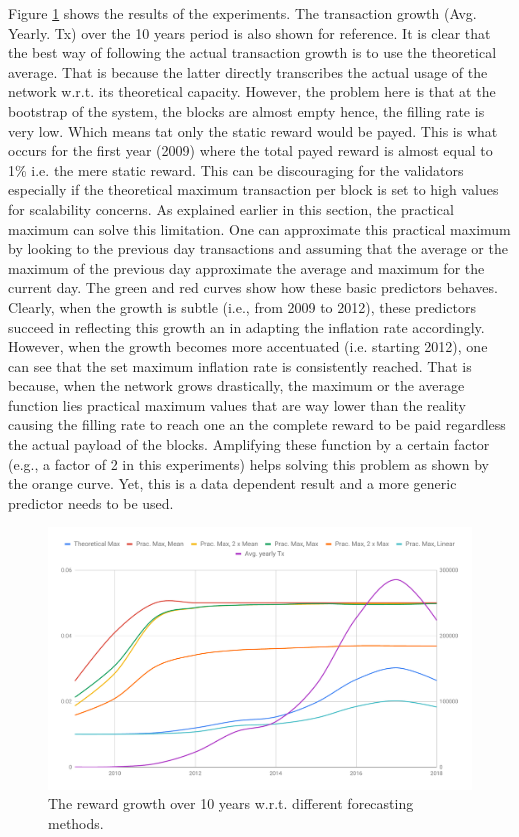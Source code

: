 Figure \ref{fig:sim} shows the results of the experiments. The transaction growth (Avg. Yearly. Tx) over the 10 years period is also shown for reference. It is clear that the best way of following the actual transaction growth is to use the theoretical average. That is because the latter directly transcribes the actual usage of the network w.r.t. its theoretical capacity. However, the problem here is that at the bootstrap of the system, the blocks are almost empty hence, the filling rate is very low. Which means tat only the static reward would be payed. This is what occurs for the first year (2009) where the total payed reward is almost equal to 1\% i.e. the mere static reward. This can be discouraging for the validators especially if the theoretical maximum transaction per block is set to high values for scalability concerns. 
As explained earlier in this section, the practical maximum can solve this limitation. One can approximate this practical maximum by looking to the previous day transactions and assuming that the average or the maximum of the previous day approximate the average and maximum for the current day. The green and red curves show how these basic predictors behaves. Clearly, when the growth is subtle (i.e., from 2009 to 2012), these predictors succeed in reflecting this growth an in adapting the inflation rate accordingly. However, when the growth becomes more accentuated (i.e. starting 2012), one can see that the set maximum inflation rate is consistently reached. That is because, when the network grows drastically, the maximum or the average function lies practical maximum values that are way lower than the reality causing the filling rate to reach one an the complete reward to be paid regardless the actual payload of the blocks. Amplifying these function by a certain factor (e.g., a factor of 2 in this experiments) helps solving this problem as shown by the orange curve. Yet, this is a data dependent result and a more generic predictor needs to be used.

\begin{figure}[h]
	\includegraphics[width=\linewidth, trim= 0cm 0cm 0cm 0cm, clip]{Figures/exp.pdf}
	\caption{The reward growth over 10 years w.r.t. different forecasting methods.}
	\label{fig:sim}
\end{figure}

